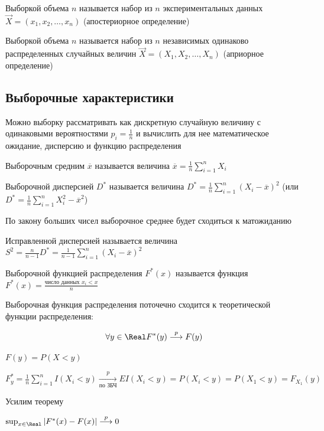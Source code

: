  Выборкой объема $n$ называется набор из $n$ экспериментальных данных $\vec{X} = (x_1, x_2, \dots, x_n)$ (апостериорное определение)

 Выборкой объема $n$ называется набор из $n$ независимых одинаково распределенных случайных
величин $\vec{X} = (X_1, X_2, \dots, X_n)$ (априорное определение)

\subsection{Выборочные характеристики}

Можно выборку рассматривать как дискретную случайную величину с одинаковыми вероятностями $p_i = \frac{1}{n}$
и вычислить для нее математическое ожидание, дисперсию и функцию распределения

\Def Выборочным средним $\overline{x}$ называется величина $\overline{x} = \frac{1}{n} \sum_{i = 1}^n X_i$

\Defs Выборочной дисперсией $D^*$ называется величина $D^* = \frac{1}{n} \sum_{i = 1}^n (X_i - \overline{x})^2$ (или $D^* = \frac{1}{n} \sum_{i = 1}^n X_i^2 - \overline{x}^2$)

По закону больших чисел выборочное среднее будет сходиться к матожиданию

\Defs Исправленной дисперсией называется величина $S^2 = \frac{n}{n - 1} D^* = \frac{1}{n - 1}\sum_{i = 1}^n (X_i - \overline{x})^2$

\hypertarget{selective_distribution_function}{}

\Def Выборочной функцией распределения $F^*(x)$ называется функция $F^*(x) = \frac{\text{число данных } x_i < x}{n}$

\begin{MyTheorem}
    \Ths Выборочная функция распределения поточечно сходится к теоретической функции распределения:

    \[\forall y \in \Real F^*(y) \overset{p}{\longrightarrow} F(y)\]
\end{MyTheorem}

\begin{MyProof}
    $F(y) = P(X < y)$

    $F^*_y = \frac{1}{n} \sum_{i = 1}^n I(X_i < y) \underset{\text{по ЗБЧ}}{\overset{p}{\longrightarrow}} EI(X_i < y) = P(X_i < y) = 
    P(X_1 < y) = F_{X_1}(y)$
\end{MyProof}

Усилим теорему

\begin{MyTheorem}
     $\sup_{x \in \Real} |F^*(x) - F(x)| \overset{p}{\longrightarrow} 0$
\end{MyTheorem}

